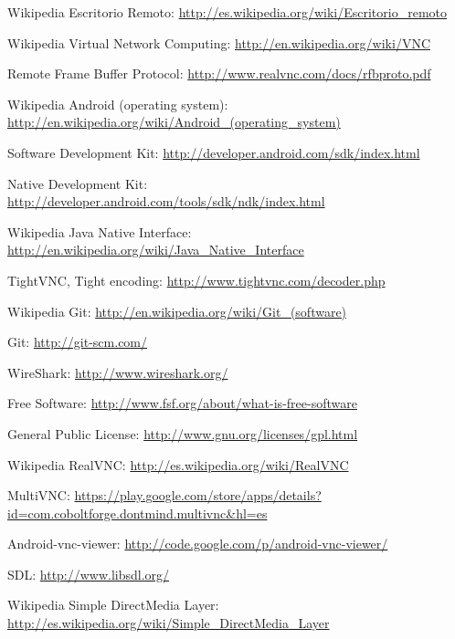
\begin{thebibliography}{11}
Wikipedia Escritorio Remoto: \url{http://es.wikipedia.org/wiki/Escritorio_remoto}

Wikipedia Virtual Network Computing: \url{http://en.wikipedia.org/wiki/VNC}

Remote Frame Buffer Protocol: \url{http://www.realvnc.com/docs/rfbproto.pdf}

Wikipedia Android (operating system): \url{http://en.wikipedia.org/wiki/Android_(operating_system)}

Software Development Kit:  \url{http://developer.android.com/sdk/index.html}

Native Development Kit: \url{http://developer.android.com/tools/sdk/ndk/index.html}

Wikipedia Java Native Interface: \url{http://en.wikipedia.org/wiki/Java_Native_Interface}

TightVNC, Tight encoding: \url{http://www.tightvnc.com/decoder.php}

Wikipedia Git: \url{http://en.wikipedia.org/wiki/Git_(software)}

Git: \url{http://git-scm.com/}

WireShark: \url{http://www.wireshark.org/}

Free Software: \url{http://www.fsf.org/about/what-is-free-software}

General Public License: \url{http://www.gnu.org/licenses/gpl.html}

Wikipedia RealVNC: \url{http://es.wikipedia.org/wiki/RealVNC}

MultiVNC: \url{https://play.google.com/store/apps/details?id=com.coboltforge.dontmind.multivnc&hl=es}

Android-vnc-viewer: \url{http://code.google.com/p/android-vnc-viewer/}

SDL: \url{http://www.libsdl.org/}

Wikipedia Simple DirectMedia Layer: \url{http://es.wikipedia.org/wiki/Simple_DirectMedia_Layer}


\end{thebibliography}
